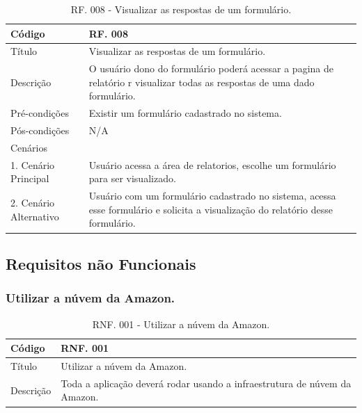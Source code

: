\documentclass[11pt]{article}
\begin{document}
        \begin{table}[h]
          \begin{center}
            \begin{tabular}{ | p{5cm} | p{10cm} | }
              \hline
              Código\cellcolor{gray} & RF. 008\cellcolor{gray} \\
              \hline
              Título & Visualizar as respostas de um formulário. \\
              \hline
              Descrição & O usuário dono do formulário poderá acessar a pagina de relatório r visualizar todas as respostas de uma dado formulário. \\
              \hline
              Pré-condições & Existir um formulário cadastrado no sistema. \\
              \hline
              Pós-condições & N/A \\
              \hline
              Cenários &   \\
              \hline
              1.  Cenário Principal & Usuário acessa a área de relatorios, escolhe um formulário para ser visualizado. \\
              \hline
              2.  Cenário Alternativo & Usuário com um formulário cadastrado no sistema, acessa esse formulário e solicita a visualização do relatório desse formulário. \\
              \hline
            \end{tabular}
            \caption{RF. 008 - Visualizar as respostas de um formulário.}
          \end{center}
        \end{table}

    \subsection{Requisitos não Funcionais}
    
      \subsubsection{Utilizar a núvem da Amazon.}

        \begin{table}[h]
          \begin{center}
            \begin{tabular}{ | p{5cm} | p{10cm} | }
              \hline
              Código\cellcolor{gray} & RNF. 001\cellcolor{gray} \\
              \hline
              Título & Utilizar a núvem da Amazon. \\
              \hline
              Descrição & Toda a aplicação deverá rodar usando a infraestrutura de núvem da Amazon. \\
              \hline
            \end{tabular}
            \caption{RNF. 001 - Utilizar a núvem da Amazon.}
          \end{center}
        \end{table}
\end{document}
